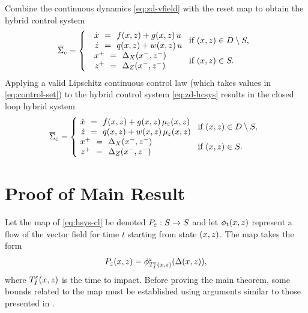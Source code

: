 Combine the continuous dynamics \eqref{eq:zd-vfield} with the reset map to obtain the hybrid control system
%
\begin{align}
  \label{eq:zd-hcsys}
  \HCSbar= \left\{
  \begin{array}{l l}
    \begin{array}{r c l}
      {\dot \zdx} &\!\!=\!\!& f\argsxz + g\argsxz \, u\\
      {\dot \zdz} &\!\!=\!\!& q\argsxz + w\argsxz \, u
    \end{array} \!\! & \!\! \mbox{if } \argsxz \in \D \setminus \Guard,\\
    \begin{array}{r c l}
      \zdx^{+} &\!\!=\!\!& \DeltaX(\zdx^{-}, \zdz^{-})\\
      \zdz^{+} &\!\!=\!\!& \DeltaZ(\zdx^{-}, \zdz^{-})
    \end{array} \!\! & \!\! \mbox{if } \argsxz \in \Guard.
  \end{array}\right.
\end{align}
%
Applying a valid Lipschitz continuous control law (which takes values in \eqref{eq:control-set}) to the hybrid control system \eqref{eq:zd-hcsys} results in the closed loop hybrid system
%
\begin{align}
  \label{eq:zd-hsys-cl}
  \HSbar_{\resclfparam} = \left\{\!\!\!\!
  \begin{array}{l l}
    \begin{array}{r c l}
      {\dot \zdx} &\!\!=\!\!& f\argsxz + g\argsxz \, \mueps\argsxz\\
      {\dot \zdz} &\!\!=\!\!& q\argsxz + w\argsxz \, \mueps\argsxz
    \end{array} \!\! & \!\! \mbox{if } \argsxz \in \D \setminus \Guard,\\
    \begin{array}{r c l}
      \zdx^{+} &\!\!=\!\!& \DeltaX(\zdx^{-}, \zdz^{-})\\
      \zdz^{+} &\!\!=\!\!& \DeltaZ(\zdx^{-}, \zdz^{-})
    \end{array} \!\! & \!\! \mbox{if } \argsxz \in \Guard.
  \end{array}\right.
\end{align}

\section{Proof of Main Result} \label{sec:proof}

Let the \Poincare{} map of \eqref{eq:hsys-cl} be denoted $P_{\varepsilon} : S \to S$ and let $\phi_{t}(x, z)$ represent a flow of the vector field for time $t$ starting from state $(x, z)$.
%
The \Poincare{} map takes the form
%
\begin{align}
  \label{eq:poincare}
  P_{\varepsilon}(x, z) = \phi^{\varepsilon}_{T_{I}^{\varepsilon}(x, z)}(\Delta(x, z)),
\end{align}
%
where $T_{I}^{\varepsilon}(x, z)$ is the time to impact.
%
Before proving the main theorem, some bounds related to the \Poincare{} map must be established using arguments similar to those presented in \cite{Ames2014,Morris2005}.

